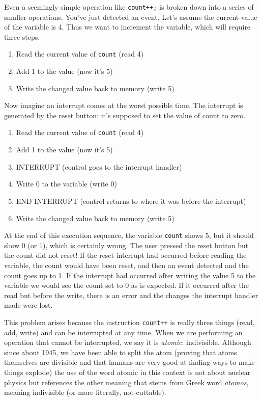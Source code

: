 Even a seemingly simple operation like \texttt{count++;} is broken down into a series of smaller operations. You've just detected an event. Let's assume the current value of the variable is 4. Thus we want to increment the variable, which will require three steps.

\begin{enumerate}
	\item Read the current value of \texttt{count} (read 4)
	\item Add 1 to the value (now it's 5)
	\item Write the changed value back to memory (write 5)
\end{enumerate}

Now imagine an interrupt comes at the worst possible time. The interrupt is generated by the reset button: it's supposed to set the value of count to zero.

\begin{enumerate}
	\item Read the current value of \texttt{count} (read 4)
	\item Add 1 to the value (now it's 5)
	\item INTERRUPT (control goes to the interrupt handler)
	\item Write 0 to the variable (write 0)
	\item END INTERRUPT (control returns to where it was before the interrupt)
	\item Write the changed value back to memory (write 5)
\end{enumerate}

At the end of this execution sequence, the variable \texttt{count} shows 5, but it should show 0 (or 1), which is certainly wrong. The user pressed the reset button but the count did not reset! If the reset interrupt had occurred before reading the variable, the count would have been reset, and then an event detected and the count goes up to 1. If the interrupt had occurred after writing the value 5 to the variable we would see the count set to 0 as is expected. If it occurred after the read but before the write, there is an error and the changes the interrupt handler made were lost.

This problem arises because the instruction \texttt{count++} is really three things (read, add, write) and can be interrupted at any time. When we are performing an operation that cannot be interrupted, we say it is \textit{atomic}: indivisible. Although since about 1945, we have been able to split the atom (proving that atoms themselves are divisible and that humans are very good at finding ways to make things explode) the use of the word atomic in this context is not about nuclear physics but references the other meaning that stems from Greek word \textit{atomos}, meaning indivisible (or more literally, not-cuttable). 


